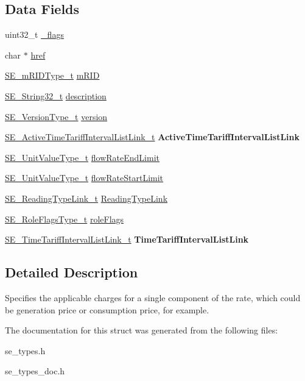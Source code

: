 \subsection*{Data Fields}
\begin{DoxyCompactItemize}
\item 
uint32\+\_\+t \hyperlink{group__RateComponent_ga0c08e678db37ea8eb9fd67e3fcae4782}{\+\_\+flags}
\item 
char $\ast$ \hyperlink{group__RateComponent_gaac1c4959b218d838c1b20379915e3abc}{href}
\item 
\hyperlink{group__mRIDType_gac74622112f3a388a2851b2289963ba5e}{S\+E\+\_\+m\+R\+I\+D\+Type\+\_\+t} \hyperlink{group__RateComponent_ga5febd8e03509ea29e372b4a5863809b6}{m\+R\+ID}
\item 
\hyperlink{group__String32_gac9f59b06b168b4d2e0d45ed41699af42}{S\+E\+\_\+\+String32\+\_\+t} \hyperlink{group__RateComponent_gab7842f1806d07c3750119171d5637ced}{description}
\item 
\hyperlink{group__VersionType_ga4b8d27838226948397ed99f67d46e2ae}{S\+E\+\_\+\+Version\+Type\+\_\+t} \hyperlink{group__RateComponent_ga0d6a6b7bf2528185f64ae073eabea734}{version}
\item 
\hyperlink{structSE__ActiveTimeTariffIntervalListLink__t}{S\+E\+\_\+\+Active\+Time\+Tariff\+Interval\+List\+Link\+\_\+t} {\bfseries Active\+Time\+Tariff\+Interval\+List\+Link}
\item 
\hyperlink{structSE__UnitValueType__t}{S\+E\+\_\+\+Unit\+Value\+Type\+\_\+t} \hyperlink{group__RateComponent_ga51e5dd2544cb9bb2fc30c5254f13ed7e}{flow\+Rate\+End\+Limit}
\item 
\hyperlink{structSE__UnitValueType__t}{S\+E\+\_\+\+Unit\+Value\+Type\+\_\+t} \hyperlink{group__RateComponent_ga4b5a6f687822495416f526dfd0f07575}{flow\+Rate\+Start\+Limit}
\item 
\hyperlink{structSE__ReadingTypeLink__t}{S\+E\+\_\+\+Reading\+Type\+Link\+\_\+t} \hyperlink{group__RateComponent_ga108a8aae6b28aac45112a19b50ac3da0}{Reading\+Type\+Link}
\item 
\hyperlink{group__RoleFlagsType_gac20b70bba5dd7d6773b13d69c372c957}{S\+E\+\_\+\+Role\+Flags\+Type\+\_\+t} \hyperlink{group__RateComponent_ga8641fd093a5e97212c53250b6509c5ed}{role\+Flags}
\item 
\hyperlink{structSE__TimeTariffIntervalListLink__t}{S\+E\+\_\+\+Time\+Tariff\+Interval\+List\+Link\+\_\+t} {\bfseries Time\+Tariff\+Interval\+List\+Link}
\end{DoxyCompactItemize}


\subsection{Detailed Description}
Specifies the applicable charges for a single component of the rate, which could be generation price or consumption price, for example. 

The documentation for this struct was generated from the following files\+:\begin{DoxyCompactItemize}
\item 
se\+\_\+types.\+h\item 
se\+\_\+types\+\_\+doc.\+h\end{DoxyCompactItemize}
